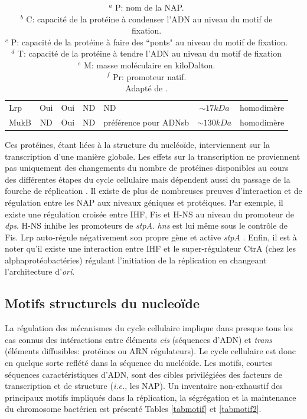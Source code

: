 \begin{table}[H]
\begin{tabular}[left]{lcccp{}cp{}}
	Lrp & Oui & Oui & ND & ND & $\sim17kDa$ & homodimère\\
	MukB & ND & Oui & ND & préférence pour ADNsb & $\sim130kDa$ & homodimère\\
	\end{tabular}
	\captionsetup{labelsep=space,justification=justified,singlelinecheck=off}
	\caption*{\footnotesize $^{a}$ P: nom de la NAP. \\  $^{b}$ C: capacité de la protéine à condenser l'ADN au niveau du motif de fixation.\\ $^{c}$ P: capacité de la protéine à faire des ``ponts" au niveau du motif de fixation.\\ $^{d}$ T: capacité de la protéine à tendre l'ADN au niveau du motif de fixation\\ $^{e}$ M: masse moléculaire en kiloDalton. \\ $^{f}$ Pr: promoteur natif.\\ Adapté de \citep{Dillon2010}.}
\end{table}
\captionsetup{}

	Ces protéines, étant liées à la structure du nucléoïde, interviennent sur la transcription d'une manière globale. Les effets sur la transcription ne proviennent pas uniquement des changements du nombre de protéines disponibles au cours des différentes étapes du cycle cellulaire mais dépendent aussi du passage de la fourche de réplication \citep{Browning2010}. Il existe de plus de nombreuses preuves d'interaction et de régulation entre les NAP aux niveaux géniques et protéiques. Par exemple, il existe une régulation croisée entre IHF, Fis et H-NS au niveau du promoteur de \textit{dps}. H-NS inhibe les promoteurs de \textit{stpA}. \textit{hns} est lui même sous le contrôle de Fis. Lrp auto-régule négativement son propre gène et active \textit{stpA} \citep{Dillon2010}. Enfin, il est à noter qu'il existe une interaction entre IHF et le super-régulateur CtrA (chez les alphaprotéobactéries) régulant l'initiation de la réplication en changeant l'architecture d'\textit{ori}\citep{thanbichler2010}.



\subsection{Motifs structurels du nucleoïde}\label{motifstruc}
  La régulation des mécanismes du cycle cellulaire implique dans presque tous les cas connus des intéractions entre éléments \textit{cis} (séquences d'ADN) et \textit{trans} (éléments diffusibles: protéines ou ARN régulateurs). Le cycle cellulaire est donc en quelque sorte reflété dans la séquence du nucléoïde. Les motifs, courtes séquences caractéristiques d'ADN, sont des cibles privilégiées des facteurs de transcription et de structure (\textit{i.e.}, les NAP). Un inventaire non-exhaustif des principaux motifs impliqués dans la réplication, la ségrégation et la maintenance du chromosome bactérien \citep{Touzain2011} est présenté Tables \ref{tabmotif} et \ref{tabmotif2}.
	
